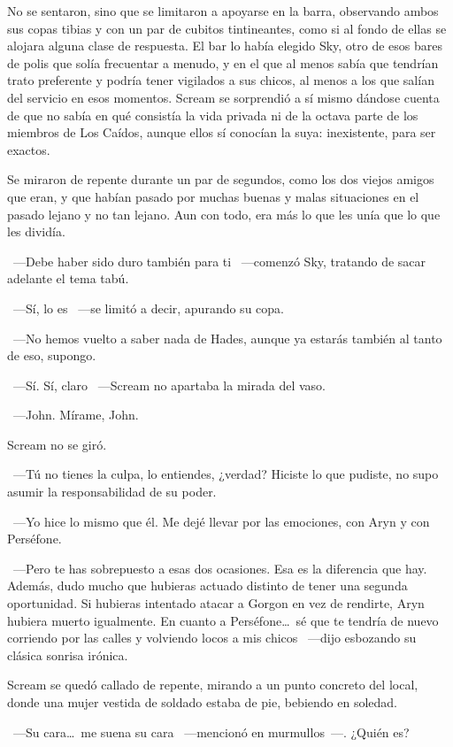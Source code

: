 No se sentaron, sino que se limitaron a apoyarse en la barra, observando ambos sus copas tibias y con un par de cubitos tintineantes, como si al fondo de ellas se alojara alguna clase de respuesta. El bar lo había elegido Sky, otro de esos bares de polis que solía frecuentar a menudo, y en el que al menos sabía que tendrían trato preferente y podría tener vigilados a sus chicos, al menos a los que salían del servicio en esos momentos. Scream se sorprendió a sí mismo dándose cuenta de que no sabía en qué consistía la vida privada ni de la octava parte de los miembros de Los Caídos, aunque ellos sí conocían la suya: inexistente, para ser exactos.

Se miraron de repente durante un par de segundos, como los dos viejos amigos que eran, y que habían pasado por muchas buenas y malas situaciones en el pasado lejano y no tan lejano. Aun con todo, era más lo que les unía que lo que les dividía.

~---Debe haber sido duro también para ti ~---comenzó Sky, tratando de sacar adelante el tema tabú.

~---Sí, lo es ~---se limitó a decir, apurando su copa.

~---No hemos vuelto a saber nada de Hades, aunque ya estarás también al tanto de eso, supongo.

~---Sí. Sí, claro ~---Scream no apartaba la mirada del vaso.

~---John. Mírame, John.

Scream no se giró.

~---Tú no tienes la culpa, lo entiendes, ¿verdad? Hiciste lo que pudiste, no supo asumir la responsabilidad de su poder.

~---Yo hice lo mismo que él. Me dejé llevar por las emociones, con Aryn y con Perséfone.

~---Pero te has sobrepuesto a esas dos ocasiones. Esa es la diferencia que hay. Además, dudo mucho que hubieras actuado distinto de tener una segunda oportunidad. Si hubieras intentado atacar a Gorgon en vez de rendirte, Aryn hubiera muerto igualmente. En cuanto a Perséfone\dots\ sé que te tendría de nuevo corriendo por las calles y volviendo locos a mis chicos ~---dijo esbozando su clásica sonrisa irónica.

Scream se quedó callado de repente, mirando a un punto concreto del local, donde una mujer vestida de soldado estaba de pie, bebiendo en soledad.

~---Su cara\dots\ me suena su cara ~---mencionó en murmullos~---. ¿Quién es?

